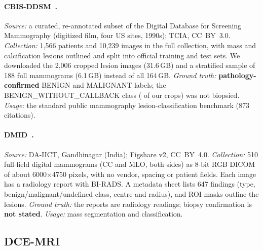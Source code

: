 \documentclass[11pt]{article}
\begin{document}
\paragraph{CBIS-DDSM~\citep{lee2017cbisddsm}.}
\emph{Source:} a curated, re-annotated subset of the Digital Database for
Screening Mammography (digitized film, four US sites, 1990s); TCIA, CC~BY~3.0.
\emph{Collection:} 1,566 patients and 10,239 images in the full collection, with
mass and calcification lesions outlined and split into official training and
test sets. We downloaded the 2,006 cropped lesion images (31.6\,GB) and a
stratified sample of 188 full mammograms (6.1\,GB) instead of all 164\,GB.
\emph{Ground truth:} \textbf{pathology-confirmed} BENIGN and MALIGNANT
labels; the BENIGN\_WITHOUT\_CALLBACK class (\cbisBWC{} of our crops) was not
biopsied. \emph{Usage:} the standard public mammography lesion-classification
benchmark (873 citations).

\paragraph{DMID~\citep{oza2024dmid}.}
\emph{Source:} DA-IICT, Gandhinagar (India); Figshare v2, CC~BY~4.0.
\emph{Collection:} 510 full-field digital mammograms (CC and MLO, both sides)
as 8-bit RGB DICOM of about 6000$\times$4750 pixels, with no vendor, spacing
or patient fields. Each image has a radiology report with BI-RADS. A metadata
sheet lists 647 findings (type, benign/malignant/undefined class, centre and
radius), and ROI masks outline the lesions. \emph{Ground truth:} the reports
are radiology readings; biopsy confirmation is \textbf{not stated}.
\emph{Usage:} mass segmentation and classification.

\subsection{DCE-MRI}
\end{document}
